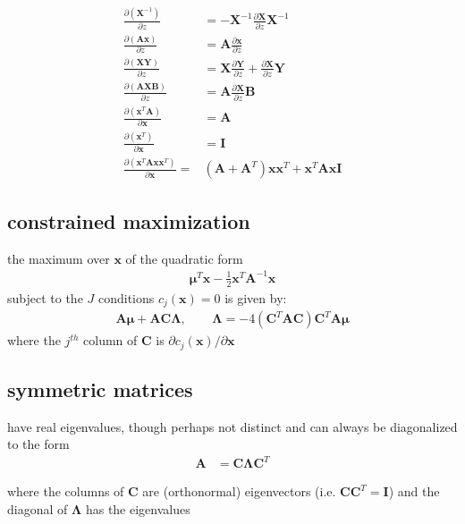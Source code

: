 \documentclass[11pt]{article}
\renewcommand{\vec}[1]{\mathbf{#1}}
\newcommand{\mat}[1]{\mathbf{#1}}
\renewcommand{\t}{T}
\newcommand{\inv}{{-1}}
\numberwithin{equation}{subsection}
\begin{document}
\begin{align}
\frac{
	\partial \left(\mat{X}^\inv\right)
}{
	\partial z
} & = -\mat{X}^\inv 
\frac{
	\partial \mat{X}
}{
	\partial z
} \mat{X}^\inv \\
%
\frac{
	\partial \left( \mat{A} \vec{x} \right)
}{
	\partial z
} & = \mat{A} 
\frac{
	\partial \vec{x}
}{
	\partial z
} \\
%
\frac{
	\partial \left(\mat{XY}\right)
}{
	\partial z
} & = \mat{X} \frac{\partial \mat{Y}}{\partial z} + 
	\frac{\partial \mat{X}}{\partial z}\mat{Y} \\
%
\frac{
	\partial \left(\mat{AXB}\right)
}{
	\partial z
} & = \mat{A} \frac{\partial \mat{X}}{\partial z} \mat{B} \\
%
\frac{
	\partial \left( \vec{x}^\t \mat{A} \right)
}{
	\partial \vec{x}
} & = \mat{A} \\
%
\frac{
	\partial \left( \vec{x}^\t \right)
}{
	\partial \vec{x}
} & = \mat{I} \\
%
\frac{
	\partial \left(\vec{x}^\t \mat{A} \vec{x} \vec{x}^\t \right)
}{
	\partial \vec{x}
} 
= & \left(\mat{A} + \mat{A}^\t\right)\vec{x}\vec{x}^\t + 
\vec{x}^\t \mat{A} \vec{x} \mat{I}
\end{align}
\subsection{constrained maximization}
the maximum over $\vec{x}$ of the quadratic form
\begin{align}
	\vec{\mu}^\t \vec{x} - \frac{1}{2} \vec{x}^\t \mat{A}^\inv \vec{x}
\end{align}
subject to the $J$ conditions $c_j(\vec{x}) = 0$ is given by:
\begin{align}
\mat{A}\vec{\mu} + \mat{A}\mat{C}\mat{\Lambda}, & & \ \ 
\mat{\Lambda} = -4 \left(\mat{C}^\t \mat{A} \mat{C}\right) 
\mat{C}^\t \mat{A} \vec{\mu}
\end{align}
where the $j^{th}$ column of $\mat{C}$ is $\partial c_j (\vec{x}) /
\partial \vec{x}$
\subsection{symmetric matrices}
have real eigenvalues, though perhaps not distinct and can always be
diagonalized to the form 
\begin{align}
	\mat{A} & = \mat{C}\mat{\Lambda}\mat{C}^\t \tag{8}
\end{align}

where the columns of $\vec{C}$ are (orthonormal) eigenvectors (i.e.
$\mat{CC}^\t = \mat{I}$) and the diagonal of $\mat{\Lambda}$ has the
eigenvalues
\end{document}
